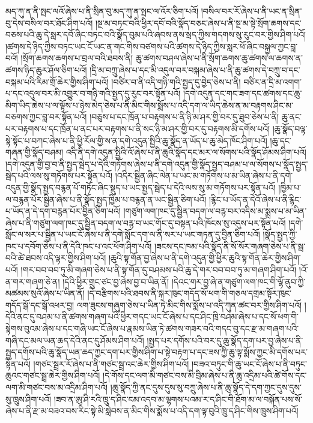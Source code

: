 མད་ཀུ་ན་ནི་སྤང་ལའོ་ཞེས་པ་ནི་སྲིན་བུ་མད་ཀུ་ན་སྤང་ལ་འོར་ཅིག་པའོ། །བསིལ་བར་རོ་ཞེས་པ་ནི་ཡང་ན་སྲིན་བུ་དེས་བསིལ་བར་ཐོང་ཤིག་པའོ། །སྔ་མ་བཏང་བའི་ཕྱིར་དབོ་བའི་སྣོད་བཅང་ཞེས་པ་ནི་སྔ་མ་སྟེ་སྲོག་ཆགས་དང་བཅས་པའི་ཆུ་དེ་སླར་དབོ་ཞིང་བཏང་བའི་སྣོད་བུམ་པའི་ཞབས་ནས་སྲད་ཀྱིས་གདགས་སུ་རུང་བར་གྱིས་ཤིག་པའོ། །ཚགས་དེ་ཉིད་ཀྱིས་བཏང་ཡང་ངོ་ཡང་ན་གང་གིས་བཙགས་པའི་ཚགས་དེ་ཉིད་ཀྱིས་སླར་ཕོ་ཞིང་བསྐྱལ་ཀྱང་བླ་བའོ། །སྲོག་ཆགས་ཆགས་པ་བྲལ་བའི་ཐབས་ནི། ཆུ་ཚགས་བཤལ་ཞེས་པ་ནི་སྲོག་ཆགས་ཆུ་ཚགས་ལ་ཆགས་ན་ཚགས་ཉིད་ཆུར་ཤོལ་ཅིག་པའོ། །དྲི་མ་བཀྲུ་ཞེས་པ་དང་མི་འདུལ་བར་བསྐམ་ཞེས་པ་ནི་ཆུ་ཚགས་དེ་བཀྲུ་བ་དང་བསྐམ་པའི་རིམ་གྲོ་ཆེར་གྱིས་ཤིག་པའོ། །བཙིར་བ་ནི་འདི་གཉི་གའི་སྤྱད་དུ་བྱེད་ཅེས་པ་ནི། བཙིར་ན་དྲི་མ་འགག་པ་དང་འདུལ་བར་མི་འགྱུར་བ་གཉི་གའི་སྤྱད་དུ་རུང་བར་སྟོན་པའོ། །དགེ་འདུན་དང་གང་ཟག་དང་ཚགས་དང་ཆུ་མིག་ཡིད་ཆེས་པ་ལ་ལྟོས་པ་ཉེས་མེད་ཅེས་པ་ནི་མིང་གིས་སྨོས་པ་འདི་དག་ལ་ཡིད་ཆེས་ན་མ་བརྟགས་ཤིང་མ་བཅགས་ཀྱང་བླ་བར་སྟོན་པའོ། །བཅུས་པ་དང་ཁྲོན་པ་བརྟགས་པ་ནི་ཉི་མ་ཤར་གྱི་བར་དུ་ཐུབ་ཅེས་པ་ནི། ཆུ་ནང་པར་བརྟགས་པ་དང་ཁྲོན་པ་ནང་པར་བརྟགས་པ་ནི་སང་ཉི་མ་ཤར་གྱི་བར་དུ་བརྟགས་མི་དགོས་པའོ། །ཆུ་སྣོད་བལྟ་སྟེ་སྟོང་པ་བཀང་ཞེས་པ་ནི་ཕྱི་རོལ་གྱི་ས་ན་དགེ་འདུན་སྤྱིའི་ཆུ་སྣོད་ན་ཡོད་པ་ཆུ་མེད་ཁོང་ཤིག་པའོ། །ཆུ་དང་གཞན་གྱི་སྣོད་བཤམ། འདི་ནི་དགེ་འདུན་སྤྱིའི་འོ་ཞེས་པ་ནི་ཆུའི་སྣོད་དང་མར་ལ་སོགས་པའི་སྣོད་ཤོམས་ཤིག་པའོ། །དགེ་འདུན་གྱི་བྱ་བ་ནི་སྤྱད་སྦེད་པ་དེའི་གཏོགས་ཞེས་པ་ནི་དགེ་འདུན་གྱི་སྣོད་སྤྱད་བཤམ་པ་ལ་སོགས་པ་སྣོད་སྤྱད་སྦེད་པའི་ལས་སུ་གཏོགས་པར་སྟོན་པའོ། །འདིར་སྦྱིན་ཞིང་ལེན་པ་ཡང་མ་གཏོགས་པ་མ་ཡིན་ཞེས་པ་ནི་དགེ་འདུན་གྱི་སྣོད་སྤྱད་བརྙན་པོ་གཏོང་ཞིང་སྡུད་པ་ཡང་སྤྱད་སྦེད་པ་དེའི་ལས་སུ་མ་གཏོགས་པར་སྟོན་པའོ། །ཁྱིམ་པ་ལ་བརྙན་པོར་སྦྱིན་ཞེས་པ་ནི་སྣོད་སྤྱད་ཁྱིམ་པ་བརྙན་ན་ཡང་སྦྱིན་ཅིག་པའོ། །རྙིང་པ་ཡོད་ན་དེའོ་ཞེས་པ་ནི་རྙིང་པ་ཡོད་ན་དེ་དག་བརྙན་པོར་བྱིན་ཅིག་པའོ། །གཙུག་ལག་ཁང་དུ་སྦྱིན་བདག་ལ་བརྙ་བར་འདིས་མ་སྨྲས་པ་མ་ཡིན་ཞེས་པ་ནི་གཙུག་ལག་ཁང་དུ་སྦྱིན་བདག་ལ་བརྙ་བ་ཡང་གོང་དུ་བསྟན་པའི་ཁོངས་སུ་འདུས་པར་སྟོན་པའོ། །དགེ་སློང་ལ་སར་པ་སྦྱིན་པ་ཡང་ངོ་ཞེས་པ་ནི་དགེ་སློང་དག་ལ་ནི་སར་པ་ཡང་གཏན་དུ་བྱིན་ཅིག་པའོ། །སྣོད་སྤྱད་ཀྱི་ཁང་པ་དབོག་ཅེས་པ་ནི་དེའི་ཁང་པ་འང་ཕོག་ཤིག་པའོ། །ཟངས་དང་ཁམ་པའི་སྣོད་ནི་སོ་སོར་གཞག་ཅེས་པ་ནི་སྦ་བའི་ཚེ་ཐབས་འདི་ལྟར་གྱིས་ཤིག་པའོ། །ཆུའི་སྟ་གོན་བྱ་ཞེས་པ་ནི་དགེ་འདུན་གྱི་ཕྱིར་ཆུའི་སྟ་གོན་ཆེར་གྱིས་ཤིག་པའོ། །གར་བབ་བབ་ཏུ་མི་གཞག་ཅེས་པ་ནི་སྟ་གོན་དུ་བཤམས་པའི་ཆུ་དེ་གར་བབ་བབ་ཏུ་མ་གཞག་ཤིག་པའོ། །འོ་ན་གར་གཞག་ཅེ་ན། །དེའི་ཕྱིར་གྲུང་ཙང་བྱ་ཞེས་བྱ་བ་ཡིན་ནོ། །དེའང་གར་བྱ་ཞེ་ན་གཙུག་ལག་ཁང་གི་ལྷོ་ནུབ་ཀྱི་མཚམས་སུའོ་ཞེས་པ་ཡིན་ནོ། །དེ་བརྩིགས་པའི་ཐབས་ནི་སྐར་ཁུང་གདོད་སོ་ཕག་གི་གཅལ་དགྲམ་སྟོར་ཁུང་གདོད་སྒོ་དང་སྒོ་འཕར་བྱ། ལག་ཟུངས་གཞུག་ཅེས་པ་ཡིན་ཏེ་མིང་གིས་སྨོས་པ་འདི་ཀུན་ཚང་བར་གྱིས་ཤིག་པའོ། །དེའི་ནང་དུ་བཤམ་པ་ནི་ཚགས་གཞག་པའི་ཕྱིར་གདང་ཡང་ངོ་ཞེས་པ་དང་ཤིང་ཁྲི་བཤམ་ཞེས་པ་དང་སོ་ཕག་གི་སྟེགས་བུའམ་ཞེས་པ་དང་གཞི་ཡང་ངོ་ཞེས་པ་རྣམས་ཡིན་ཏེ་ཚགས་གཟར་བའི་གདང་བུ་དང་རྫ་མ་གཞག་པའི་གཞི་དང་མལ་ཡན་ཆད་དེའི་ནང་དུ་ཤོམས་ཤིག་པའོ། །སྤྱད་པར་དགོས་པའི་བར་དུ་ཆུ་སྣོད་དག་པར་བྱ་ཞེས་པ་ནི་སྤྱད་དགོས་པའི་ཆུ་སྣོད་ཡན་ཆད་ཀྱང་དག་པར་གྱིས་ཤིག་པ་སྟེ་བརྟག་པ་དང་ཟས་ཀྱི་ཆུ་ལྟ་སྨོས་ཀྱང་མི་དགོས་པར་སྟོན་པའོ། །གཙང་སྦྲར་རོ་ཞེས་པ་ནི་གཙང་སྦྲ་འང་ཆེར་གྱིས་ཤིག་པའོ། །བཟའ་བཏུང་གི་ཆུ་ཡང་ངོ་ཞེས་པ་ནི་བཏུང་ཆུའང་གཙང་སྦྲ་ཆེར་གྱིས་ཤིག་པའོ། །དེ་གོས་དང་ལག་མི་གཙང་བས་མི་བྲིམ་ཞེས་པ་ནི་ཆུ་འདྲིམ་པའི་ཚེ་གོས་དང་ལག་མི་གཙང་བས་མ་འདྲིམ་ཤིག་པའོ། །ཆུ་སྣོད་ཀྱི་ནང་དུས་དུས་སུ་བཀྲུ་ཞེས་པ་ནི་ཆུ་སྣོད་དེ་དག་ཀྱང་དུས་དུས་སུ་ཁྲུས་ཤིག་པའོ། །ཟབ་ན་ཨུ་ཤི་རའི་ཁྲུ་ད་ཤིང་ངམ་འདབ་མ་ལྷགས་པའམ་ར་ད་ཤིང་གི་ཐོག་མ་ལ་བསྐོན་པས་སོ་ཞེས་པ་ནི་རྫ་མ་བཟའ་བས་རིང་སྟེ་མི་སླེབས་ན་མིང་གིས་སྨོས་པ་འདི་དག་ལྟ་བུའི་ཁྲུ་ད་ཤིང་གིས་ཁྲུས་ཤིག་པའོ། 